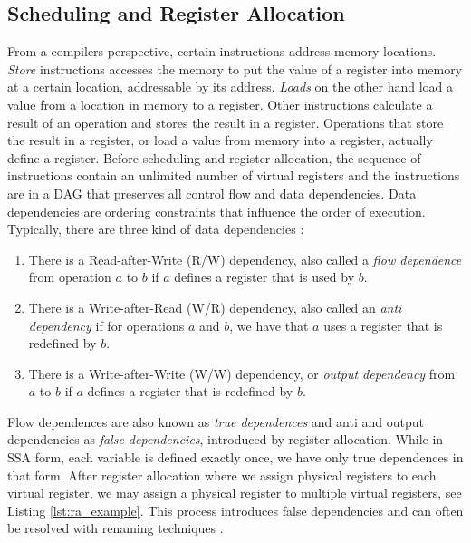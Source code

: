 

\subsection{Scheduling and Register Allocation}\label{sec:scheduling_and_ra}
From a compilers perspective, certain instructions address memory locations. \emph{Store} instructions accesses the memory to put the value of a register into memory at a certain location, addressable by its address. \emph{Loads} on the other hand load a value from a location in memory to a register. Other instructions calculate a result of an operation and stores the result in a register. Operations that store the result in a register, or load a value from memory into a register, actually define a register. Before scheduling and register allocation, the sequence of instructions contain an unlimited number of virtual registers and the instructions are in a DAG that preserves all control flow and data dependencies. Data dependencies are ordering constraints that influence the order of execution. Typically, there are three kind of data dependencies \cite{data_dependece}:
\begin{enumerate}
\item There is a Read-after-Write (R/W) dependency, also called a \emph{flow dependence} from operation $a$ to $b$ if $a$ defines a register that is used by $b$.
\item  There is a Write-after-Read (W/R) dependency, also called an \emph{anti dependency} if for operations $a$ and $b$, we have that $a$ uses a register that is redefined by $b$. 
\item There is a Write-after-Write (W/W) dependency, or \emph{output dependency} from $a$ to $b$ if $a$ defines a register that is redefined by $b$.
\end{enumerate} 
Flow dependences are also known as \emph{true dependences} and anti and output dependencies as \emph{false dependencies}, introduced by register allocation. While in SSA form, each variable is defined exactly once, we have only true dependences in that form. After register allocation where we assign physical registers to each virtual register, we may assign a physical register to multiple virtual registers, see Listing \ref{lst:ra_example}. This process introduces false dependencies and can often be resolved with renaming techniques \cite{renaming}. 

